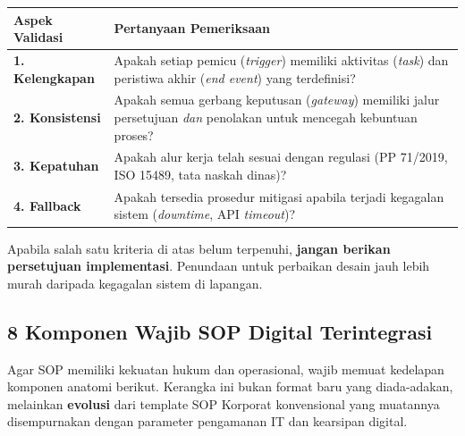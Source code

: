 \documentclass[11pt,a4paper]{article}
\begin{document}
\begin{table}[h!]
\centering\small
\begin{tabularx}{\textwidth}{@{} l X @{}}
\toprule
\textbf{Aspek Validasi} & \textbf{Pertanyaan Pemeriksaan} \\
\midrule
\rowcolor{plnblue!5}
\textbf{1. Kelengkapan} & Apakah setiap pemicu (\textit{trigger}) memiliki aktivitas (\textit{task}) dan peristiwa akhir (\textit{end event}) yang terdefinisi? \\
\textbf{2. Konsistensi} & Apakah semua gerbang keputusan (\textit{gateway}) memiliki jalur persetujuan \textit{dan} penolakan untuk mencegah kebuntuan proses? \\
\rowcolor{plnblue!5}
\textbf{3. Kepatuhan} & Apakah alur kerja telah sesuai dengan regulasi (PP 71/2019, ISO 15489, tata naskah dinas)? \\
\textbf{4. Fallback} & Apakah tersedia prosedur mitigasi apabila terjadi kegagalan sistem (\textit{downtime}, API \textit{timeout})? \\
\bottomrule
\end{tabularx}
\end{table}

\begin{warnbox}
Apabila salah satu kriteria di atas belum terpenuhi, \textbf{jangan berikan persetujuan implementasi}. Penundaan untuk perbaikan desain jauh lebih murah daripada kegagalan sistem di lapangan.
\end{warnbox}

\subsection{8 Komponen Wajib SOP Digital Terintegrasi}
Agar SOP memiliki kekuatan hukum dan operasional, wajib memuat kedelapan komponen anatomi berikut. Kerangka ini bukan format baru yang diada-adakan, melainkan \textbf{evolusi} dari template SOP Korporat konvensional yang muatannya disempurnakan dengan parameter pengamanan IT dan kearsipan digital.
\end{document}
